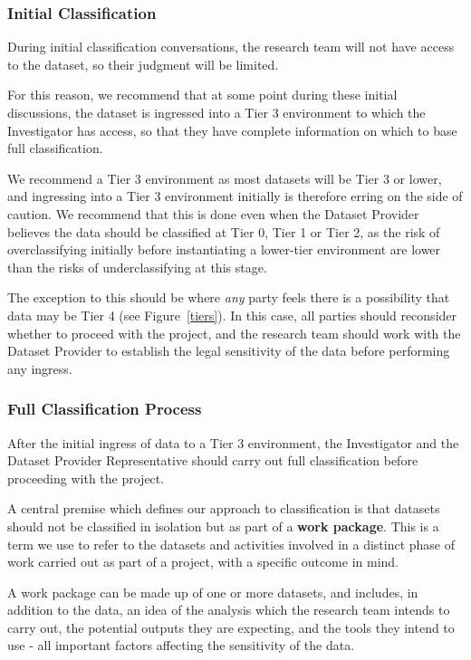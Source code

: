\documentclass[10pt,a4paper,twocolumn]{article}
\begin{document}
\subsubsection{Initial Classification}
\label{sec:initial}

During initial classification conversations, the research team will not have access to the dataset, so their judgment will be limited.

For this reason, we recommend that at some point during these initial  discussions, the dataset is ingressed into a Tier 3 environment to which the Investigator has access, so that they have complete information on which to base full classification.

We recommend a Tier 3 environment as most datasets will be Tier 3 or lower, and ingressing into a Tier 3 environment initially is therefore erring on the side of caution. We recommend that this is done even when the Dataset Provider believes the data should be classified at Tier 0, Tier 1 or Tier 2, as the risk of overclassifying initially before instantiating a lower-tier environment are lower than the risks of underclassifying at this stage.

The exception to this should be where \textit{any} party feels there is a possibility that data may be Tier 4 (see Figure~\ref{tiers}). In this case, all parties should reconsider whether to proceed with the project, and the research team should work with the Dataset Provider to establish the legal sensitivity of the data before performing any ingress.

\subsubsection{Full Classification Process}

After the initial ingress of data to a Tier 3 environment, the Investigator and the Dataset Provider Representative should carry out full classification before proceeding with the project. 

A central premise which defines our approach to classification is that datasets should not be classified in isolation but as part of a \textbf{work package}. This is a term we use to refer to the datasets and activities involved in a distinct phase of work carried out as part of a project, with a specific outcome in mind. 

A work package can be made up of one or more datasets, and includes, in addition to the data, an idea of the analysis which the research team intends to carry out, the potential outputs they are expecting, and the tools they intend to use - all important factors affecting the sensitivity of the data.
\end{document}
